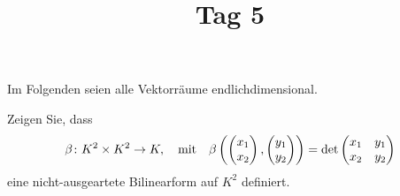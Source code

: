 \documentclass[a4paper, 10pt]{scrartcl}
\title{Tag 5}
\author{}
\date{}
\begin{document}
Im Folgenden seien alle Vektorräume endlichdimensional.










\begin{question}[subtitle = Die Determinante als Bilinearform]
  Zeigen Sie, dass
  \[
            \beta
    \colon  K^2 \times K^2
    \to     K,
    \quad\text{mit}\quad
      \beta\left( \begin{pmatrix} x_1 \\ x_2 \end{pmatrix}, \begin{pmatrix} y_1 \\ y_2 \end{pmatrix} \right)
    = \det
      \begin{pmatrix}
        x_1 & y_1 \\
        x_2 & y_2
      \end{pmatrix}
  \]
  eine nicht-ausgeartete Bilinearform auf $K^2$ definiert.
\end{question}
\end{document}
